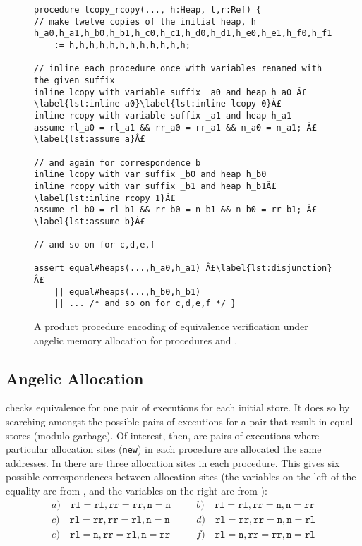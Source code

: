 \documentclass[runningheads,a4paper]{llncs}
\newcommand*{\news}{\texttt{new}}
\begin{document}
\begin{figure}[htbp]%
\centering%
\noindent\begin{lstlisting}[style=Boogie,firstnumber=auto,name=copyex]
procedure lcopy_rcopy(..., h:Heap, t,r:Ref) {
// make twelve copies of the initial heap, h
h_a0,h_a1,h_b0,h_b1,h_c0,h_c1,h_d0,h_d1,h_e0,h_e1,h_f0,h_f1
    := h,h,h,h,h,h,h,h,h,h,h,h;

// inline each procedure once with variables renamed with the given suffix
inline lcopy with variable suffix _a0 and heap h_a0 Â£\label{lst:inline a0}\label{lst:inline lcopy 0}Â£
inline rcopy with variable suffix _a1 and heap h_a1
assume rl_a0 = rl_a1 && rr_a0 = rr_a1 && n_a0 = n_a1; Â£\label{lst:assume a}Â£

// and again for correspondence b
inline lcopy with var suffix _b0 and heap h_b0
inline rcopy with var suffix _b1 and heap h_b1Â£\label{lst:inline rcopy 1}Â£
assume rl_b0 = rl_b1 && rr_b0 = n_b1 && n_b0 = rr_b1; Â£\label{lst:assume b}Â£

// and so on for c,d,e,f

assert equal#heaps(...,h_a0,h_a1) Â£\label{lst:disjunction}Â£
    || equal#heaps(...,h_b0,h_b1)
    || ... /* and so on for c,d,e,f */ }
\end{lstlisting}
\caption{A product procedure encoding of equivalence verification under angelic memory allocation for procedures \copylr{} and \copyrl{}.\label{fig:product}}
\end{figure}

\subsection{Angelic Allocation}

\Tool{} checks equivalence for one pair of executions for each initial store. It does so by searching amongst the possible pairs of executions for a pair that result in equal stores (modulo garbage). Of interest, then, are pairs of executions where particular allocation sites (\news{}) in each procedure are allocated the same addresses. In  there are three allocation sites in each procedure.  This gives six possible correspondences between allocation sites (the variables on the left of the equality are from \copylr{}, and the variables on the right are from \copyrl{}):
\[\begin{aligned}
  a)\quad \mathtt{rl} = \mathtt{rl}, \mathtt{rr} = \mathtt{rr}, \mathtt{n} = \mathtt{n} &&\quad
  b)\quad \mathtt{rl} = \mathtt{rl}, \mathtt{rr} = \mathtt{n}, \mathtt{n} = \mathtt{rr} \\
  c)\quad \mathtt{rl} = \mathtt{rr}, \mathtt{rr} = \mathtt{rl}, \mathtt{n} = \mathtt{n} &&\quad
  d)\quad \mathtt{rl} = \mathtt{rr}, \mathtt{rr} = \mathtt{n}, \mathtt{n} = \mathtt{rl} \\
  e)\quad \mathtt{rl} = \mathtt{n}, \mathtt{rr} = \mathtt{rl}, \mathtt{n} = \mathtt{rr} &&\quad
  f)\quad \mathtt{rl} = \mathtt{n}, \mathtt{rr} = \mathtt{rr}, \mathtt{n} = \mathtt{rl}
\end{aligned}\]
\end{document}
